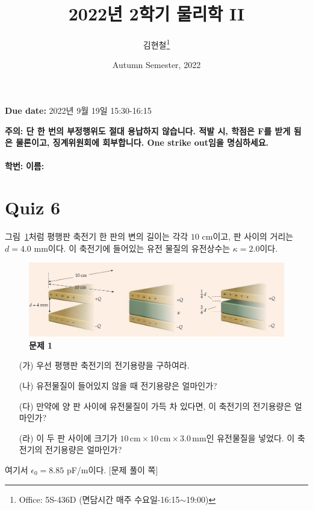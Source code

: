 \documentclass[tightenlines,floatfix,nofootinbib,superscriptaddress,fleqn]{revtex4}
\begin{document}
\title{\Large 2022년 2학기 물리학 II}
\author{김현철\footnote{Office: 5S-436D (면담시간 매주
    수요일-16:15$\sim$19:00)}} 
\date{Autumn Semester, 2022}

\maketitle

{\color{red} {\bf Due date:} 2022년 9월 19일  15:30-16:15 }
\vspace{1.cm}

\noindent \textbf{ 주의: \color{blue} 단 한 번의 부정행위도 절대
  용납하지 않습니다. 적발 시, 학점은 F를 받게 됨은 물론이고,
  징계위원회에 회부합니다. One strike out임을 명심하세요.} 
\\
\\

{\bf 학번:} \hspace{4cm}
{\bf 이름:} 

\section*{\large Quiz 6}
그림~\ref{fig:1}처럼 평행판 축전기 한 판의 변의 길이는 각각 $10$
cm이고, 판 사이의 거리는 $d=4.0$ mm이다. 이 축전기에 들어있는 유전
물질의 유전상수는 $\kappa=2.0$이다. 
\begin{figure}[htp]
  \centering
  \includegraphics[scale=0.6]{qfig6-20220919-2.png}
  \caption{\textbf{문제 1}}
  \label{fig:1}
\end{figure}
\begin{itemize}
\item[(가)] 우선 평행판 축전기의 전기용량을 구하여라. 
\item[(나)] 유전물질이 들어있지 않을 때 전기용량은 얼마인가?  
\item[(다)] 만약에 양 판 사이에 유전물질이 가득 차 있다면, 이 축전기의
  전기용량은 얼마인가? 
\item[(라)] 이 두 판 사이에 크기가 $10\,\mathrm{cm}\times
  10\,\mathrm{cm}\times 3.0\,\mathrm{mm}$인 유전물질을 넣었다. 이
  축전기의 전기용량은 얼마인가? 
\end{itemize}
여기서 $\epsilon_0=8.85$ pF/m이다. 
\newpage
{\color{gray} [문제 풀이 쪽]}
\newpage
\end{document}
